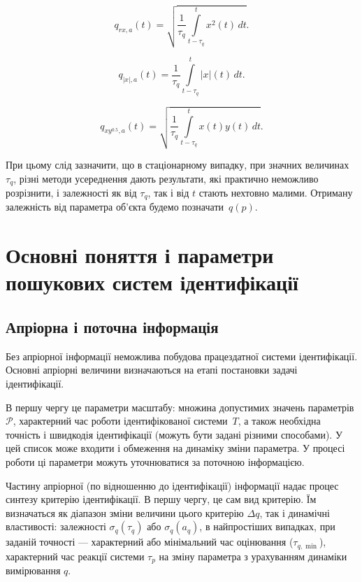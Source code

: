 \begin{equation}
  q_{rx,a}(t) =
  \sqrt{
    \frac{1}{\tau_q}
    \int\limits_{t-\tau_q}^{t} x^2(t) \, dt
  }.
  \label{atu:eq:qrxa}
\end{equation}

\begin{equation}
  q_{|x|,a}(t) =
  \frac{1}{\tau_q}
  \int\limits_{t-\tau_q}^{t} |x|(t) \, dt
  .
  \label{atu:eq:qxma}
\end{equation}

\begin{equation}
  q_{xy^{0.5},a}(t) =
  \sqrt{
    \frac{1}{\tau_q}
    \int\limits_{t-\tau_q}^{t} x(t)y(t) \, dt
  }
  .
  \label{atu:eq:qxy05a}
\end{equation}

При цьому слід зазначити, що в стаціонарному випадку, при значних
величинах
$\tau_q$, різні методи усереднення дають результати, які практично неможливо
розрізнити, і залежності як від
$\tau_q$, так і від
$t$ стають нехтовно малими. Отриману залежність від
параметра об'єкта будемо позначати~$q(p)$\label{atu:d:q_p}.





\section{Основні поняття і параметри пошукових систем ідентифікації}%

\subsection{Апріорна і поточна інформація}%

Без апріорної інформації неможлива побудова працездатної системи ідентифікації.
Основні апріорні величини визначаються на етапі постановки задачі
ідентифікації.

В першу чергу це параметри масштабу: множина допустимих значень
параметрів \label{atu:d:p_set} \(\mathcal{P} \), характерний час роботи
ідентифікованої системи~$T$,
а також необхідна точність і швидкодія ідентифікації (можуть
бути задані різними способами). У цей список може входити і
обмеження на динаміку зміни параметра. У процесі роботи ці
параметри можуть уточнюватися за поточною інформацією.

Частину апріорної (по відношенню до ідентифікації) інформації
надає процес синтезу критерію ідентифікації. В першу чергу, це сам вид
критерію. Їм визначаться як діапазон зміни величини цього критерію
$\Delta q$\label{atu:d:Delta_q}, так і динамічні властивості: залежності
$\sigma_q(\tau_q)$ або $\sigma_q(a_q)$,
в найпростіших випадках, при заданій точності --- характерний або
мінімальний час оцінювання ($\tau_{q, \min}$),
характерний час реакції
системи $\tau_p$ на зміну параметра з урахуванням динаміки вимірювання $q$.

